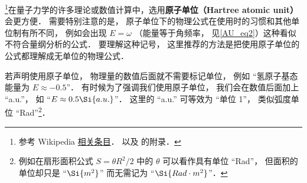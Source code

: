 

\footnote{参考 Wikipedia \href{https://en.wikipedia.org/wiki/Hartree_atomic_units}{相关条目}． 以及 \cite{Brandsen} 的附录．}在量子力学的许多理论或数值计算中，选用\textbf{原子单位（Hartree atomic unit）}会更方便． 需要特别注意的是， 原子单位下的物理公式在使用时的习惯和其他单位制有所不同， 例如会出现 $E = \omega$ （能量等于角频率， 见\autoref{AU_eq2}）这种看似不符合量纲分析的公式． 要理解这种记号， 这里推荐的方法是把使用原子单位的公式都理解成无单位的物理公式．

若声明使用原子单位， 物理量的数值后面就不需要标记单位， 例如 “氢原子基态能量为 $E \approx -0.5$”． 有时候为了强调我们使用原子单位， 我们会在数值后面加上 “a.u.”， 如 “$E \approx 0.5 \Si{a.u.}$”． 这里的 “a.u.” 可等效为 “单位 1”， 类似弧度单位 “Rad”\footnote{例如在扇形面积公式 $S = \theta R^2/2$ 中的 $\theta$ 可以看作具有单位 “Rad”， 但面积的单位却只是 “$\Si{m^2}$” 而无需记为 “$\Si{Rad\cdot m^2}$”．}．

